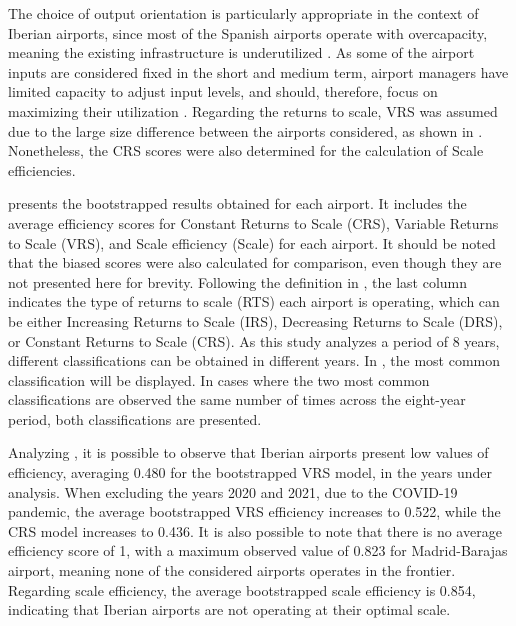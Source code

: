 The choice of output orientation is particularly appropriate in the context of Iberian airports, since
most of the Spanish airports operate with overcapacity, meaning the existing infrastructure is underutilized \cite{nerja2021}. As some of the airport inputs are considered fixed in the short and medium term, airport managers have limited capacity to adjust input levels,
and should, therefore, focus on maximizing their utilization \cite{martin2001}. Regarding the returns to scale, VRS was assumed due to the large size difference between the airports considered, as shown in . Nonetheless, the CRS
scores were also determined for the calculation of Scale efficiencies. 

 presents the bootstrapped results obtained for each airport. It includes the average efficiency scores for Constant Returns to Scale (CRS), Variable Returns to Scale (VRS), and Scale efficiency (Scale) for each airport. It should be noted that the biased scores were also calculated for comparison, even though they are not presented here for brevity. Following the definition in , the last column indicates the type of returns to scale (RTS) each airport is operating, which can
be either Increasing Returns to Scale (IRS), Decreasing Returns to Scale (DRS), or Constant Returns to Scale (CRS). As this study analyzes a period of 8 years, different classifications can be obtained in
different years. In , the most common classification will be displayed. In cases where the two
most common classifications are observed the same number of times across the eight-year period, both
classifications are presented.

Analyzing , it is possible to observe that Iberian airports present low values of efficiency,
averaging 0.480 for the bootstrapped VRS model, in the years under
analysis.
When excluding the years 2020 and 2021, due to the COVID-19 pandemic, the average
bootstrapped VRS efficiency increases to 0.522, while the CRS model increases to 0.436. It is also
possible to note that there is no average efficiency score of 1, with a maximum observed
value of 0.823 for Madrid-Barajas airport, meaning none of the considered airports operates in the
frontier. Regarding scale efficiency, the average bootstrapped scale efficiency is 0.854, indicating that
Iberian airports are not operating at their optimal scale.


